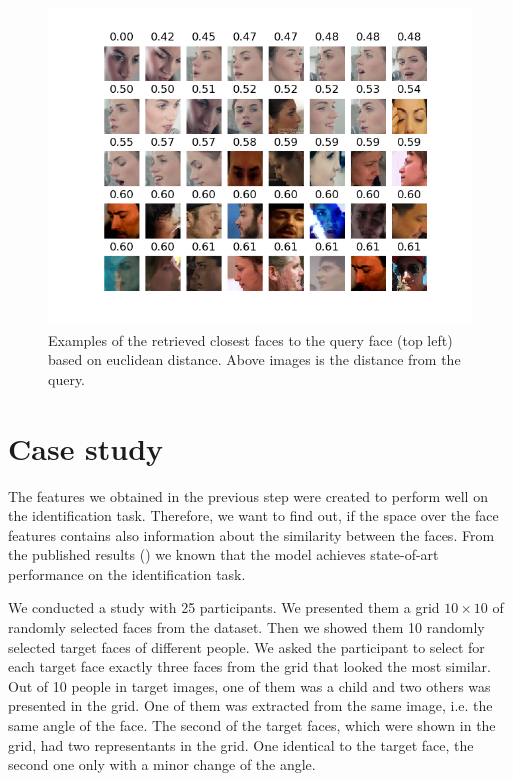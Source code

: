 \begin{figure}
    \centering
    \includegraphics[width=\linewidth]{img/closest_faces_to_woman.png}
    \caption{Examples of the retrieved closest faces to the query face (top left) based on euclidean distance. Above images is the distance from the query.}
    \label{fig:closest_faces}
\end{figure}

\section{Case study}

The features we obtained in the previous step were created to perform well on the identification task. Therefore, we want to find out, if the space over the face features contains also information about the similarity between the faces. From the published results (\cite{}) we known that the model achieves state-of-art performance on the identification task.

We conducted a study with 25 participants. We presented them a grid $10\times10$ of randomly selected faces from the dataset. 
Then we showed them 10 randomly selected target faces of different people. We asked the participant to select for each target face exactly three faces from the grid that looked the most similar. Out of 10 people in target images, one of them was a child and two others was presented in the grid.
One of them was extracted from the same image, i.e. the same angle of the face. The second of the target faces, which were shown in the grid, had two representants in the grid. One identical to the target face, the second one only with a minor change of the angle.


